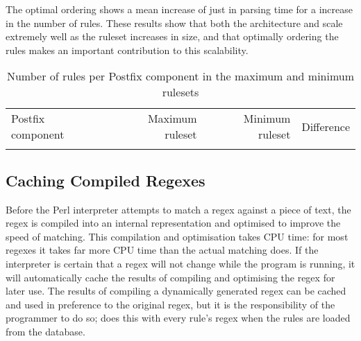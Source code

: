 The optimal ordering shows a mean increase of just
 in parsing time
for a \numberOFrulesMAXIMUMpercentage{} increase in the number of rules.
These results show that both the architecture and \parsername{} scale
extremely well as the ruleset increases in size, and that optimally
ordering the rules makes an important contribution to this scalability.



\begin{table}[thbp]
    \caption{Number of rules per Postfix component in the maximum and
    minimum rulesets}
    \empty{}\label{Number of rules per Postfix component in the maximum and
    minimum rulesets}
    \centering{}
    \begin{tabular}{lrrr}
        \tabletopline{}%
        Postfix component & Maximum ruleset & Minimum ruleset & Difference \\
        \tablemiddleline{}%
        
        \tablebottomline{}%
    \end{tabular}
\end{table}

\FloatBarrier{}

\subsection{Caching Compiled Regexes}

\label{Caching compiled regexes}

Before the Perl interpreter attempts to match a regex against a piece of
text, the regex is compiled into an internal representation and optimised
to improve the speed of matching.  This compilation and optimisation takes
CPU time: for most regexes it takes far more CPU time than the actual
matching does.  If the interpreter is certain that a regex will not change
while the program is running, it will automatically cache the results of
compiling and optimising the regex for later use.  The results of compiling
a dynamically generated regex can be cached and used in preference to the
original regex, but it is the responsibility of the programmer to do so;
\parsername{} does this with every rule's regex when the rules are loaded
from the database.


